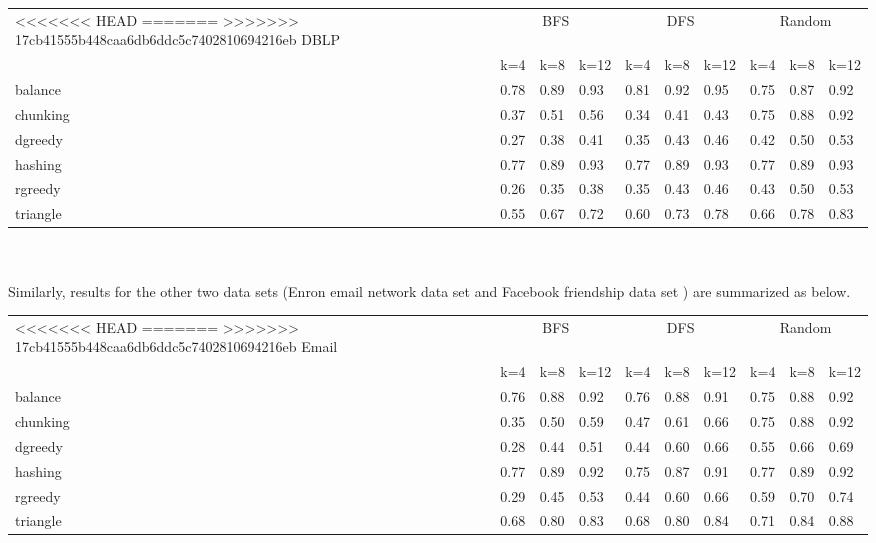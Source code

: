 \documentclass[12pt]{article}
\begin{document}
\begin{tabular}{llllllllll}
<<<<<<< HEAD
\toprule
=======
\toprule
>>>>>>> 17cb41555b448caa6db6ddc5c7402810694216eb
    DBLP & \multicolumn{3}{c}{BFS} & \multicolumn{3}{c}{DFS} & \multicolumn{3}{c}{Random}\\

    & k=4 & k=8 & k=12
    & k=4 & k=8 & k=12
     & k=4 & k=8 & k=12  \\
    \midrule
    balance &    0.78 	& 0.89 	& 0.93 &	 0.81 &	 0.92 &	 0.95 &	 0.75 &	 0.87 &	 0.92   \\
chunking&	 0.37 &	 0.51 &	 0.56 &	 0.34 &	 0.41 &	 0.43 &	 0.75 &	 0.88 &	 0.92 \\
dgreedy&	 0.27 &	 0.38& 	 0.41 & 	 0.35 & 	 0.43 & 	 0.46 & 	 0.42 &  	 0.50 & 	 0.53 \\
hashing&	 0.77 &	 0.89 & 	 0.93 & 	 0.77 & 	 0.89 & 	 0.93 & 	 0.77 & 	 0.89 & 	 0.93 \\
rgreedy	& 0.26 &	 0.35 & 	 0.38 & 	 0.35 & 	 0.43 & 	 0.46 & 	 0.43 & 	 0.50 & 	 0.53 \\
triangle	 &0.55 &	 0.67 & 	 0.72 & 	 0.60 & 	 0.73 & 	 0.78 & 	 0.66 & 	 0.78 & 	 0.83 \\
    \bottomrule
\end{tabular}
\\
\\

Similarly, results for the other two data sets (Enron email network data set and Facebook friendship data set ) are summarized as below.\\

\begin{tabular}{llllllllll}
<<<<<<< HEAD
\toprule
=======
\toprule
>>>>>>> 17cb41555b448caa6db6ddc5c7402810694216eb
    Email & \multicolumn{3}{c}{BFS} & \multicolumn{3}{c}{DFS} & \multicolumn{3}{c}{Random}\\

    & k=4 & k=8 & k=12
    & k=4 & k=8 & k=12
     & k=4 & k=8 & k=12  \\
    \midrule
    balance &  0.76 &	 0.88 &	 0.92 &	 0.76 &	 0.88 &	 0.91 &	 0.75 &	 0.88 &	 0.92 \\
chunking&	 0.35 &	 0.50 &	 0.59 &	 0.47 &	 0.61 &	 0.66 &	 0.75 &	 0.88 &	 0.92 \\
dgreedy&	 0.28 &	 0.44 &	 0.51 &	 0.44 &	 0.60 &	 0.66 &	 0.55 &	 0.66 &	 0.69 \\
hashing&	   0.77& 	 0.89 &	 0.92 &	 0.75 &	 0.87 &	 0.91 &	 0.77 &	 0.89 &	 0.92 \\
rgreedy&	   0.29& 	 0.45 &	 0.53 &	 0.44 &	 0.60 &	 0.66 &	 0.59 &	 0.70 &	 0.74 \\
triangle&	   0.68& 	 0.80 &	 0.83 &	 0.68 &	 0.80 &	 0.84 &	 0.71 &	 0.84 &	 0.88 \\
    \bottomrule
\end{tabular}
\end{document}
